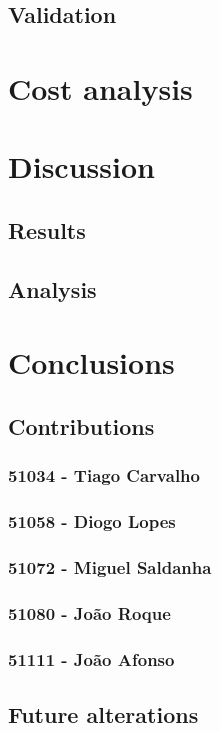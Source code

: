 \documentclass{article}
\begin{document}
    \subsection{Validation}
    \label{sec:validation}

\section{Cost analysis}
\label{sec:cost}

\section{Discussion}
\label{sec:discussion}
    \subsection{Results}
    \label{sec:results}

    \subsection{Analysis}
    \label{sec:analysis}

\section{Conclusions}
\label{sec:conclusion}

    \subsection{Contributions}
    \label{sec:contributions}

      \subsubsection{51034 - Tiago Carvalho}
      \subsubsection{51058 - Diogo Lopes}
      \subsubsection{51072 - Miguel Saldanha}
      \subsubsection{51080 - João Roque}
      \subsubsection{51111 - João Afonso}

    \subsection{Future alterations}
    \label{sec:alterations}
\end{document}
